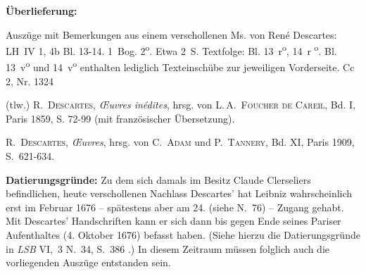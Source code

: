 \begin{ledgroupsized}[r]{120mm}%
\footnotesize%
\pstart%
\noindent\textbf{\"{U}berlieferung:}%
\pend%
\end{ledgroupsized}%
\begin{ledgroupsized}[r]{114mm}%
\footnotesize%
\pstart%
\parindent -6mm%
%
Auszüge mit Bemerkungen aus einem verschollenen Ms. von René Descartes:\protect{}
LH~IV 1, 4b Bl. 13-14.
1~Bog. 2\textsuperscript{o}.
Etwa 2\, S.
Textfolge: Bl. 13~r\textsuperscript{o}, 14~r \textsuperscript{o}.
Bl. 13~v\textsuperscript{o} und 14~v\textsuperscript{o} enthalten lediglich Texteinschübe zur jeweiligen Vorderseite.
\newline%
Cc 2, Nr. 1324%
\pend%
\end{ledgroupsized}%
%
\begin{ledgroupsized}[r]{114mm}%
\footnotesize%
\pstart%
\parindent -6mm%
%
(tlw.) \cite{01121}\textsc{R.~Descartes}, \textit{{\OE}uvres in\'{e}dites}, hrsg. von \textsc{L.\,A.~Foucher de Careil}, Bd. I, Paris 1859, S. 72-99 (mit franz\"{o}sischer \"{U}bersetzung).%
\pend%
\end{ledgroupsized}%
%
\begin{ledgroupsized}[r]{114mm}%
\footnotesize%
\pstart%
\parindent -6mm%
%
\cite{00120}\textsc{R.~Descartes}, \textit{{\OE}uvres}, hrsg. von \textsc{C.~Adam} und \textsc{P.~Tannery}, Bd. XI, Paris 1909, S.~621-634.%
\pend%
\end{ledgroupsized}%
%
\vspace*{5mm}%
\begin{ledgroup}%
\footnotesize%
\count{}
\count{}
\count{}
\pstart%
\noindent%
\footnotesize{%
\textbf{Datierungsgr\"{u}nde:}
Zu dem sich damals im Besitz Claude Clerseliers befindlichen, heute verschollenen Nachlass Descartes' hat Leibniz wahrscheinlich erst im Februar 1676
-- spätestens aber am 24. (siehe N.~76) %
 -- Zugang gehabt.
Mit Descartes' Handschriften kann er sich dann bis gegen Ende seines Pariser Aufenthaltes (4. Oktober 1676) befasst haben.
(Siehe hierzu die Datierungsgründe in \cite{01122}\textit{LSB} VI,~3 N.~34, S.~386%
.) In diesem Zeitraum müssen folglich auch die vorliegenden Auszüge entstanden sein.%
}%
\pend%
\end{ledgroup}%
